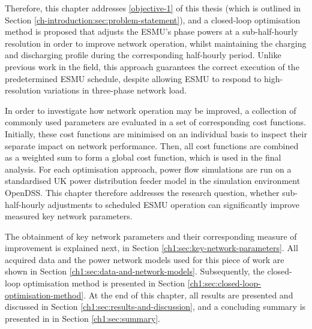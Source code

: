 Therefore, this chapter addresses \ref{objective-1} of this thesis (which is outlined in Section \ref{ch-introduction:sec:problem-statement}), and a closed-loop optimisation method is proposed that adjusts the ESMU's phase powers at a sub-half-hourly resolution in order to improve network operation, whilst maintaining the charging and discharging profile during the corresponding half-hourly period.
Unlike previous work in the field, this approach guarantees the correct execution of the predetermined ESMU schedule, despite allowing ESMU to respond to high-resolution variations in three-phase network load.

In order to investigate how network operation may be improved, a collection of commonly used parameters are evaluated in a set of corresponding cost functions.
Initially, these cost functions are minimised on an individual basis to inspect their separate impact on network performance.
Then, all cost functions are combined as a weighted sum to form a global cost function, which is used in the final analysis.
For each optimisation approach, power flow simulations are run on a standardised UK power distribution feeder model in the simulation environment OpenDSS.
This chapter therefore addresses the research question, whether sub-half-hourly adjustments to scheduled ESMU operation can significantly improve measured key network parameters.

The obtainment of key network parameters and their corresponding measure of improvement is explained next, in Section \ref{ch1:sec:key-network-parameters}.
All acquired data and the power network models used for this piece of work are shown in Section \ref{ch1:sec:data-and-network-models}.
Subsequently, the closed-loop optimisation method is presented in Section \ref{ch1:sec:closed-loop-optimisation-method}.
At the end of this chapter, all results are presented and discussed in Section \ref{ch1:sec:results-and-discussion}, and a concluding summary is presented in in Section \ref{ch1:sec:summary}.
